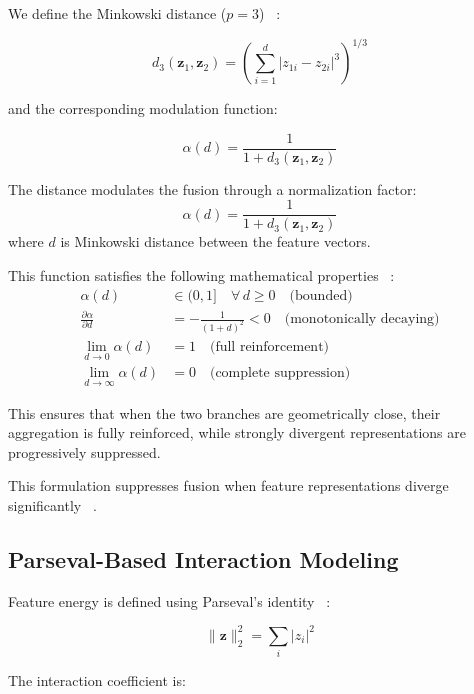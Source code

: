 \documentclass[12pt]{article}
\begin{document}
We define the Minkowski distance ($p=3$) ~\cite{b6}:

\begin{equation*}
d_3(\mathbf{z}_1, \mathbf{z}_2)
=
\left( \sum_{i=1}^{d} |z_{1i} - z_{2i}|^3 \right)^{1/3}
\end{equation*}

and the corresponding modulation function:

\begin{equation*}
\alpha(d) = \frac{1}{1 + d_3(\mathbf{z}_1, \mathbf{z}_2)}
\end{equation*}

The distance modulates the fusion through a normalization factor:
\begin{equation*}
    \alpha(d) = \frac{1}{1 + d_3(\mathbf{z}_1, \mathbf{z}_2)}
\end{equation*}
where $d$ is Minkowski distance between the feature vectors.

This function satisfies the following mathematical properties ~\cite{b32}: 
\begin{align*}
    \alpha(d) &\in (0, 1] \quad \forall \, d \geq 0 \quad \text{(bounded)} \\
    \frac{\partial \alpha}{\partial d} &= -\frac{1}{(1+d)^2} < 0 \quad \text{(monotonically decaying)} \\
    \lim_{d \to 0} \alpha(d) &= 1 \quad \text{(full reinforcement)} \\
    \lim_{d \to \infty} \alpha(d) &= 0 \quad \text{(complete suppression)}
\end{align*}

This ensures that when the two branches are geometrically close, their aggregation is fully reinforced, while strongly divergent representations are progressively suppressed.

This formulation suppresses fusion when feature representations diverge significantly ~\cite{b7}.

\subsection{Parseval-Based Interaction Modeling}

Feature energy is defined using Parseval's identity ~\cite{b8}:

\begin{equation*}
\|\mathbf{z}\|_2^2 = \sum_i |z_i|^2
\end{equation*}

The interaction coefficient is:
\end{document}
